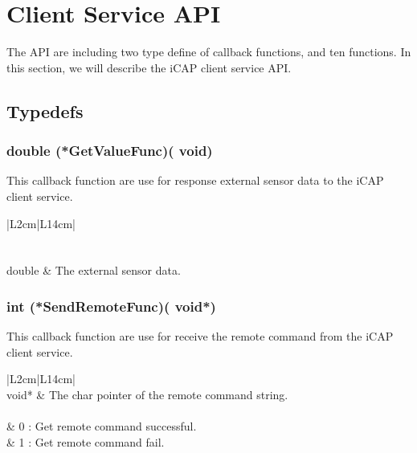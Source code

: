 \section{Client Service API}
The API are including two type define of callback functions, and ten functions.
In this section, we will describe the iCAP client service API.

\subsection{Typedefs}

\subsubsection {{\color{blue} double} (*GetValueFunc)({\color{blue} void})}
This callback function are use for response external sensor data to the iCAP client service.
\begin{table}[H]
	\large
	\begin{tabular}{|L{2cm}|L{14cm}|}
		\hline
		\\
		\hline
		\\
		\hline
		\\
		\hline
		{\color{blue}double} & The external sensor data.\\
		\hline
	\end{tabular}
\end{table}

\subsubsection {{\color{blue} int} (*SendRemoteFunc)({\color{blue} void}*)}
This callback function are use for receive the remote command from the iCAP client service.
\begin{table}[H]
	\large
	\begin{tabular}{|L{2cm}|L{14cm}|}
		\hline
		\\
		\hline
		{\color{blue}void}* & The char pointer of the remote command string.\\
		\hline
		\\
		\hline
		 & 0 : Get remote command successful.\\
										 & 1 : Get remote command fail.\\
		\hline
	\end{tabular}
\end{table}
\newpage

